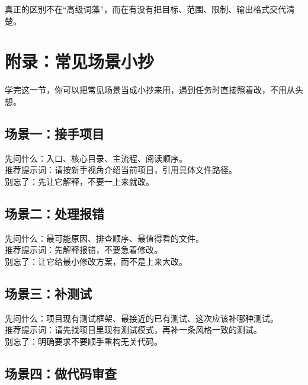\documentclass[UTF8,a4paper,12pt]{ctexart}
\begin{document}
\begin{sumbox}
真正的区别不在“高级词藻”，而在有没有把目标、范围、限制、输出格式交代清楚。
\end{sumbox}

\section{附录：常见场景小抄}

\begin{learnbox}
学完这一节，你可以把常见场景当成小抄来用，遇到任务时直接照着改，不用从头想。
\end{learnbox}

\subsection{场景一：接手项目}

\begin{tipbox}
先问什么：入口、核心目录、主流程、阅读顺序。\\
推荐提示词：请按新手视角介绍当前项目，引用具体文件路径。\\
别忘了：先让它解释，不要一上来就改。
\end{tipbox}

\subsection{场景二：处理报错}

\begin{tipbox}
先问什么：最可能原因、排查顺序、最值得看的文件。\\
推荐提示词：先解释报错，不要急着修改。\\
别忘了：让它给最小修改方案，而不是上来大改。
\end{tipbox}

\subsection{场景三：补测试}

\begin{tipbox}
先问什么：项目现有测试框架、最接近的已有测试、这次应该补哪种测试。\\
推荐提示词：请先找项目里现有测试模式，再补一条风格一致的测试。\\
别忘了：明确要求不要顺手重构无关代码。
\end{tipbox}

\subsection{场景四：做代码审查}
\end{document}
